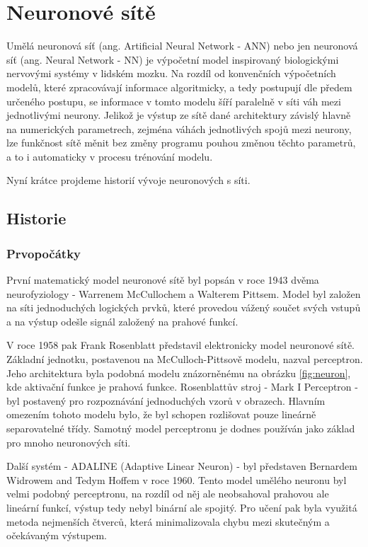 \chapter{Neuronové sítě}
\label{sec:NN}

Umělá neuronová síť (ang. Artificial Neural Network - ANN) nebo jen neuronová
síť (ang. Neural Network - NN) je výpočetní model inspirovaný biologickými
nervovými systémy v lidském mozku. Na rozdíl od konvenčních výpočetních modelů,
které zpracovávají informace algoritmicky, a tedy postupují dle předem určeného
postupu, se informace v tomto modelu šíří paralelně v síti váh mezi
jednotlivými neurony. Jelikož je výstup ze sítě dané architektury závislý
hlavně na numerických parametrech, zejména váhách jednotlivých spojů mezi
neurony, lze funkčnost sítě měnit bez změny programu pouhou změnou těchto
parametrů, a to i automaticky v procesu trénování modelu.

Nyní krátce projdeme historií vývoje neuronových s síti.

\section{Historie}
\label{sec:NN_History}

\subsection{Prvopočátky}
První matematický model neuronové sítě byl popsán v roce 1943 dvěma
neurofyziology - Warrenem McCullochem a Walterem Pittsem. \cite{McCulloch1943}
Model byl založen na síti jednoduchých logických prvků, které provedou vážený
součet svých vstupů a na výstup odešle signál založený na prahové funkcí.

V roce 1958 pak Frank Rosenblatt představil elektronicky model neuronové sítě.
Základní jednotku, postavenou na McCulloch-Pittsově modelu, nazval perceptron.
\cite{Rosenblatt1958} Jeho architektura byla podobná modelu znázorněnému na
obrázku \ref{fig:neuron}, kde aktivační funkce je prahová funkce. Rosenblattův
stroj - Mark I Perceptron - byl postavený pro rozpoznávání jednoduchých vzorů v
obrazech. Hlavním omezením tohoto modelu bylo, že byl schopen rozlišovat pouze
lineárně separovatelné třídy. Samotný model perceptronu je dodnes používán jako
základ pro mnoho neuronových síti.

Další systém - ADALINE (Adaptive Linear Neuron) - byl představen Bernardem
Widrowem and Tedym Hoffem v roce 1960. Tento model umělého neuronu byl velmi
podobný perceptronu, na rozdíl od něj ale neobsahoval prahovou ale lineární
funkcí, výstup tedy nebyl binární ale spojitý. Pro učení pak byla využitá
metoda nejmenších čtverců, která minimalizovala chybu mezi skutečným a
očekávaným výstupem. \cite{nn_history}

